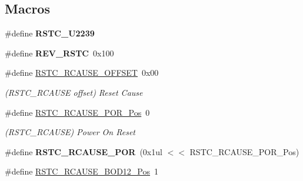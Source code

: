 \subsection*{Macros}
\begin{DoxyCompactItemize}
\item 
\hypertarget{group___s_a_m_l21___r_s_t_c_gae452d229cc5dcb4b294eaeedee7a6f0e}{}\#define {\bfseries R\+S\+T\+C\+\_\+\+U2239}\label{group___s_a_m_l21___r_s_t_c_gae452d229cc5dcb4b294eaeedee7a6f0e}

\item 
\hypertarget{group___s_a_m_l21___r_s_t_c_ga33df22702ff6046cd1628dcc7823f2cd}{}\#define {\bfseries R\+E\+V\+\_\+\+R\+S\+T\+C}~0x100\label{group___s_a_m_l21___r_s_t_c_ga33df22702ff6046cd1628dcc7823f2cd}

\item 
\hypertarget{group___s_a_m_l21___r_s_t_c_ga38a42ad205d598987a470c95bdf8059c}{}\#define \hyperlink{group___s_a_m_l21___r_s_t_c_ga38a42ad205d598987a470c95bdf8059c}{R\+S\+T\+C\+\_\+\+R\+C\+A\+U\+S\+E\+\_\+\+O\+F\+F\+S\+E\+T}~0x00\label{group___s_a_m_l21___r_s_t_c_ga38a42ad205d598987a470c95bdf8059c}

\begin{DoxyCompactList}\small\item\em (R\+S\+T\+C\+\_\+\+R\+C\+A\+U\+S\+E offset) Reset Cause \end{DoxyCompactList}\item 
\hypertarget{group___s_a_m_l21___r_s_t_c_ga2b2524b4868c25389bb56d839ab21cfb}{}\#define \hyperlink{group___s_a_m_l21___r_s_t_c_ga2b2524b4868c25389bb56d839ab21cfb}{R\+S\+T\+C\+\_\+\+R\+C\+A\+U\+S\+E\+\_\+\+P\+O\+R\+\_\+\+Pos}~0\label{group___s_a_m_l21___r_s_t_c_ga2b2524b4868c25389bb56d839ab21cfb}

\begin{DoxyCompactList}\small\item\em (R\+S\+T\+C\+\_\+\+R\+C\+A\+U\+S\+E) Power On Reset \end{DoxyCompactList}\item 
\hypertarget{group___s_a_m_l21___r_s_t_c_ga354b58a426a4691a66a768da50566ada}{}\#define {\bfseries R\+S\+T\+C\+\_\+\+R\+C\+A\+U\+S\+E\+\_\+\+P\+O\+R}~(0x1ul $<$$<$ R\+S\+T\+C\+\_\+\+R\+C\+A\+U\+S\+E\+\_\+\+P\+O\+R\+\_\+\+Pos)\label{group___s_a_m_l21___r_s_t_c_ga354b58a426a4691a66a768da50566ada}

\item 
\hypertarget{group___s_a_m_l21___r_s_t_c_gaf01b22748aa08f131b1a3d6e531fc540}{}\#define \hyperlink{group___s_a_m_l21___r_s_t_c_gaf01b22748aa08f131b1a3d6e531fc540}{R\+S\+T\+C\+\_\+\+R\+C\+A\+U\+S\+E\+\_\+\+B\+O\+D12\+\_\+\+Pos}~1\label{group___s_a_m_l21___r_s_t_c_gaf01b22748aa08f131b1a3d6e531fc540}


\end{DoxyCompactItemize}
